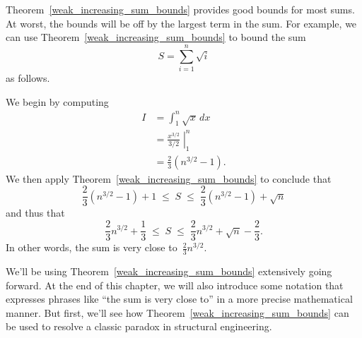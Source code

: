 \iffalse

\begin{figure}

\subfloat[]{\graphic{Fig_G9-a}}

\subfloat[]{\graphic{Fig_G9-b}}

\subfloat[]{\graphic{Fig_G9-c}}

\caption{The area of the shaded region in~(a) is $S = \sum_{i = 1}^n
  f(i)$.  The area in the shaded regions in (b) and~(c) is $I =
  \int_1^n f(x)\,dx$.}

\label{fig:9G9}

\end{figure}
\fi

Theorem~\ref{weak_increasing_sum_bounds} provides good bounds for most sums.  At worst,
the bounds will be off by the largest term in the sum.  For example,
we can use Theorem~\ref{weak_increasing_sum_bounds} to bound the sum
\[
    S = \sum_{i = 1}^n \sqrt{i}
\]
as follows.

We begin by computing
\begin{align*}
    I   &= \int_1^n \sqrt{x} \, dx \\
        &= \left. \frac{x^{3/2}}{3/2} \; \right|_1^n \\
        &= \frac{2}{3} (n^{3/2} - 1).
\end{align*}
We then apply Theorem~\ref{weak_increasing_sum_bounds} to conclude that
\[
    \frac{2}{3} (n^{3/2} - 1) + 1
    \; \le \; S
    \; \le \; \frac{2}{3} (n^{3/2} - 1) + \sqrt{n}
\]
and thus that
\[
    \frac{2}{3} n^{3/2} + \frac{1}{3}
    \; \le \; S
    \; \le \; \frac{2}{3} n^{3/2} + \sqrt{n} - \frac{2}{3}.
\]
In other words, the sum is very close to~$\frac{2}{3} n^{3/2}$.

We'll be using Theorem~\ref{weak_increasing_sum_bounds} extensively going forward.  At
the end of this chapter, we will also introduce some notation that
expresses phrases like ``the sum is very close to'' in a more precise
mathematical manner.  But first, we'll see how Theorem~\ref{weak_increasing_sum_bounds}
can be used to resolve a classic paradox in structural engineering.

\begin{problems}
\practiceproblems
{}

\examproblems
{}

\homeworkproblems
{}

\end{problems}


